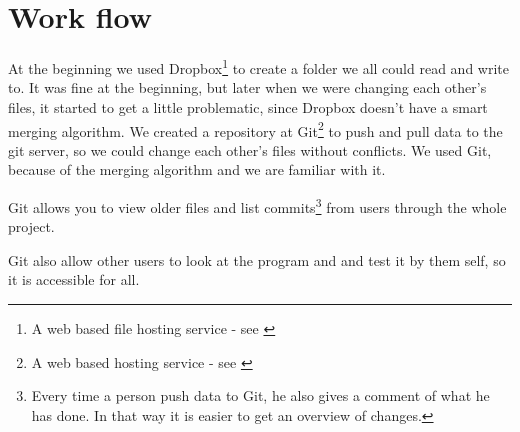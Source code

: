 \chapter{Work flow}
At the beginning we used Dropbox\footnote{A web based file hosting service - see \cite{Dropbox}} to create a folder we all could read and write to. It was fine at the beginning, but later when we were changing each other's files, it started to get a little problematic, since Dropbox doesn't have a smart merging algorithm.
We created a repository at Git\footnote{A web based hosting service - see \cite{Git}} to push and pull data to the git server, so we could change each other's files without conflicts. We used Git, because of the merging algorithm and we are familiar with it.

Git allows you to view older files and list commits\footnote{Every time a person push data to Git, he also gives a comment of what he has done. In that way it is easier to get an overview of changes.} from users through the whole project.

Git also allow other users to look at the program and and test it by them self, so it is accessible for all.